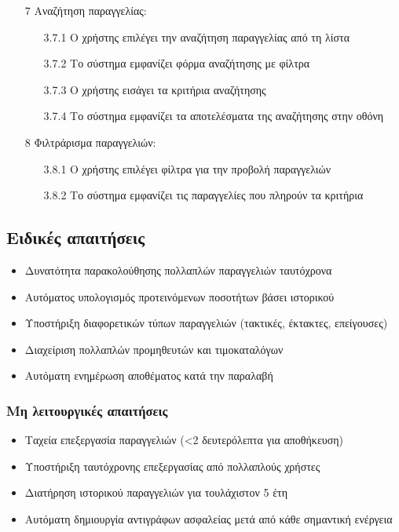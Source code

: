\documentclass[12pt,a4paper,twoside]{book}
\begin{document}
\begin{enumerate}
\begin{enumerate}
        \end{enumerate}
  \item[7 ] Αναζήτηση παραγγελίας:
        \begin{enumerate}
          \item[3.7.1 ] Ο χρήστης επιλέγει την αναζήτηση παραγγελίας από τη λίστα
          \item[3.7.2 ] Το σύστημα εμφανίζει φόρμα αναζήτησης με φίλτρα %
          \item[3.7.3 ] Ο χρήστης εισάγει τα κριτήρια αναζήτησης
          \item[3.7.4 ] Το σύστημα εμφανίζει τα αποτελέσματα της αναζήτησης στην οθόνη
        \end{enumerate}
  \item[8 ] Φιλτράρισμα παραγγελιών:
        \begin{enumerate}
          \item[3.8.1 ] Ο χρήστης επιλέγει φίλτρα για την προβολή παραγγελιών %
          \item[3.8.2 ] Το σύστημα εμφανίζει τις παραγγελίες που πληρούν τα κριτήρια
        \end{enumerate}
\end{enumerate}

\subsection{Ειδικές απαιτήσεις}
\begin{itemize}
  \item Δυνατότητα παρακολούθησης πολλαπλών παραγγελιών ταυτόχρονα
  \item Αυτόματος υπολογισμός προτεινόμενων ποσοτήτων βάσει ιστορικού
  \item Υποστήριξη διαφορετικών τύπων παραγγελιών (τακτικές, έκτακτες, επείγουσες)
  \item Διαχείριση πολλαπλών προμηθευτών και τιμοκαταλόγων
  \item Αυτόματη ενημέρωση αποθέματος κατά την παραλαβή
\end{itemize}

\subsubsection{Μη λειτουργικές απαιτήσεις}
\begin{itemize}
  \item Ταχεία επεξεργασία παραγγελιών (<2 δευτερόλεπτα για αποθήκευση)
  \item Υποστήριξη ταυτόχρονης επεξεργασίας από πολλαπλούς χρήστες
  \item Διατήρηση ιστορικού παραγγελιών για τουλάχιστον 5 έτη
  \item Αυτόματη δημιουργία αντιγράφων ασφαλείας μετά από κάθε σημαντική ενέργεια
\end{itemize}
\end{document}

